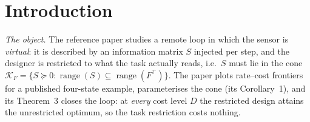 \section{Introduction}\label{sec:intro}

\emph{The object.} The reference paper \cite{refpaper} studies a remote loop in
which the sensor is \emph{virtual}: it is described by an information matrix $S$
injected per step, and the designer is restricted to what the task actually
reads, i.e.\ $S$ must lie in the cone
$\mathcal K_F=\{S\succeq0:\operatorname{range}(S)\subseteq
\operatorname{range}(F^{\top})\}$. The paper plots rate--cost frontiers for a
published four-state example, parameterises the cone (its Corollary~1), and its
Theorem~3 closes the loop: at \emph{every} cost level $D$ the restricted design
attains the unrestricted optimum, so the task restriction costs nothing.

